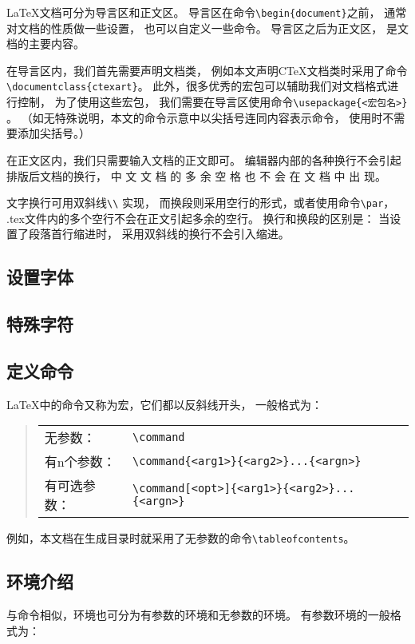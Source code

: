 \documentclass{ctexart}
\begin{document}
	\LaTeX 文档可分为导言区和正文区。
	导言区在命令\verb|\begin{document}|之前，
	通常对文档的性质做一些设置，
	也可以自定义一些命令。
	导言区之后为正文区，
	是文档的主要内容。
	
	在导言区内，我们首先需要声明文档类，
	例如本文声明C\TeX 文档类时采用了命令\verb|\documentclass{ctexart}|。
	此外，很多优秀的宏包可以辅助我们对文档格式进行控制，
	为了使用这些宏包，
	我们需要在导言区使用命令\verb|\usepackage{<宏包名>}| 。
	（如无特殊说明，本文的命令示意中以尖括号连同内容表示命令，
	使用时不需要添加尖括号。）
	
	在正文区内，我们只需要输入文档的正文即可。
	编辑器内部的各种换行不会引起排版后文档的换行，
	中 文 文 档 的 多 余 空 格 也 不 会 在 文 档 中 出 现。 \par
	文字换行可用双斜线\verb|\\| 实现，
	而换段则采用空行的形式，或者使用命令\verb|\par|，
	.tex文件内的多个空行不会在正文引起多余的空行。
	换行和换段的区别是：
	当设置了段落首行缩进时，
	采用双斜线的换行不会引入缩进。
	
	\subsection{设置字体}
	
	\subsection{特殊字符}
	\subsection{定义命令}
	\LaTeX 中的命令又称为宏，它们都以反斜线开头，
	一般格式为：
	
	\begin{quote}	%
		\begin{tabular}{ll}
			无参数： & \verb|\command| \\
			有n个参数： & \verb|\command{<arg1>}{<arg2>}...{<argn>}| \\
			有可选参数： & \verb|\command[<opt>]{<arg1>}{<arg2>}...{<argn>}| 
		\end{tabular}
	\end{quote}

	例如，本文档在生成目录时就采用了无参数的命令\verb|\tableofcontents|。
		
	\subsection{环境介绍}
	与命令相似，环境也可分为有参数的环境和无参数的环境。
	有参数环境的一般格式为：
	
\end{document}
